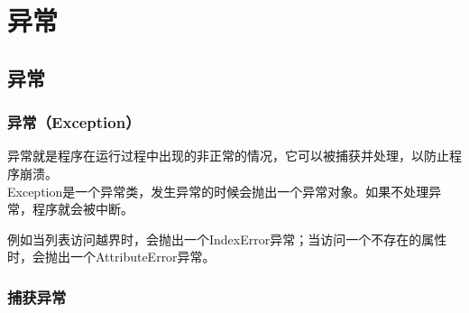 \chapter{异常}

\section{异常}

\subsection{异常（Exception）}

异常就是程序在运行过程中出现的非正常的情况，它可以被捕获并处理，以防止程序崩溃。\\

Exception是一个异常类，发生异常的时候会抛出一个异常对象。如果不处理异常，程序就会被中断。\\

\begin{table}[H]
    \centering
    \caption{常用异常}
\end{table}

例如当列表访问越界时，会抛出一个IndexError异常；当访问一个不存在的属性时，会抛出一个AttributeError异常。\\

\subsection{捕获异常}

